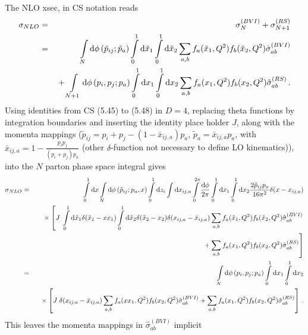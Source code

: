\documentclass[a4paper,10pt]{scrartcl}
\newcommand{\nnb}{\nonumber}
\newcommand{\bea}{\begin{eqnarray}}
\newcommand{\eea}{\end{eqnarray}}
\newcommand{\done}{{\rm d}}
\begin{document}
The NLO xsec, in CS notation reads
\bea
 \sigma_{NLO}
& = & \sigma_{N}^{(BVI)} + \sigma_{N+1}^{(RS)} \\
& = & \int\limits_N\done\phi\left(\tilde{p}_{ij};\tilde{p}_a\right)
      \int\limits_0^1\done\tilde{x}_1\int\limits_0^1\done\tilde{x}_2
      \sum\limits_{a,b}
        f_a(\tilde{x}_1,Q^2) f_b(\tilde{x}_2,Q^2)
        \hat\sigma_{ab}^{(BVI)} \nnb\\
&&{}+ \int\limits_{N+1}\done\phi\left(p_i,p_j;p_a\right)
      \int\limits_0^1\done x_1\int\limits_0^1\done x_2
      \sum\limits_{a,b} f_a(x_1,Q^2) f_b(x_2,Q^2)
      \hat\sigma_{ab}^{(RS)}\,.
\eea
Using identities from CS (5.45) to (5.48) in $D=4$, replacing theta
functions by integration boundaries and inserting the identity place holder $J$,
along with the momenta mappings ($\tilde{p}_{ij}=p_i+p_j-
(1-\bar{x}_{ij,a})p_a$, $\tilde{p}_a=
\bar{x}_{ij,a}p_a$, with $\bar{x}_{ij,a}=
1-\frac{p_ip_j}{(p_i+p_j)p_a}$ (other $\delta$-function not necessary to 
define LO kinematics)), into the $N$ parton phase space integral gives
\bea
 \sigma_{NLO}
& = & \int\limits_0^1\done x\int\limits_N\done\phi\left(\tilde{p}_{ij};p_a,x\right)
      \int\limits_0^1\done z_i\int\done x_{ij,a}
      \int\limits_0^{2\pi}\frac{\done\phi}{2\pi}
      \int\limits_0^1\done x_1\int\limits_0^1\done x_2
      \frac{2\tilde{p}_{ij}p_a}{16\pi^2}\delta(x-x_{ij,a})\nnb\\
&&\hspace*{2mm}{}\times
      \left[
            J\;\int\limits_0^1\done\tilde{x}_1\delta(\tilde{x}_1-xx_1)
            \int\limits_0^1\done\tilde{x}_2\delta(\tilde{x}_2-x_2)
            \delta(x_{ij,a}-\bar{x}_{ij,a})
            \sum\limits_{a,b} f_a(\tilde{x}_1,Q^2)
            f_b(\tilde{x}_2,Q^2)
            \hat\sigma_{ab}^{(BVI)}\right. \nnb\\
&&\hspace*{5mm}\left.{}
           +\sum\limits_{a,b} f_a(x_1,Q^2) f_b(x_2,Q^2)
            \hat\sigma_{ab}^{(RS)}\right] \\
& = & \int\limits_N\done\phi\left(p_i,p_j;p_a\right)
      \int\limits_0^1\done x_1\int\limits_0^1\done x_2 \nnb\\
&&\hspace*{2mm}{}\times
      \left[
            J\;\delta(x_{ij,a}-\bar{x}_{ij,a})
            \sum\limits_{a,b} f_a(xx_1,Q^2) f_b(x_2,Q^2)
            \hat\sigma_{ab}^{(BVI)}
           +\sum\limits_{a,b} f_a(x_1,Q^2) f_b(x_2,Q^2)
            \hat\sigma_{ab}^{(RS)}\right]\,.
\eea
This leaves the momenta mappings in $\hat\sigma_{ab}^{(BVI)}$ implicit
\end{document}
